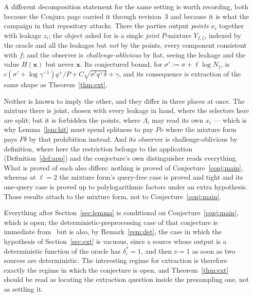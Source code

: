 \documentclass{conjura-conjecture}
\newcommand{\vx}{\mathbf{x}}
\begin{document}
\begin{remark}\label{rem:mixture}
A different decomposition statement for the same setting is worth
recording, both because the Conjura page carried it through revision~3 and
because it is what the campaign in that repository attacks. There the
parties output \emph{points} $x_i$ together with leakage $z_i$; the object
asked for is a single \emph{joint} $P$-mixture $Y_{f,\zeta}$, indexed by
the oracle and all the leakages but \emph{not} by the points, every
component consistent with $f$; and the observer is
\emph{challenge-oblivious} by fiat, seeing the leakage and the value
$H(\vx)$ but never $\vx$. Its conjectured bound, for
$\sigma' := \sigma + \ell\log N_1$, is
$c(\sigma'+\log\gamma^{-1})q^{+}/P + C\sqrt{\sigma'q^{+}\delta} + \gamma$,
and its consequence is extraction of the same shape as
Theorem~\ref{thm:ext}.

Neither is known to imply the other, and they differ in three places at
once. The mixture there is joint, chosen with every leakage in hand, where
the selectors here are split; but it is forbidden the points, where
$\Lambda_i$ may read its own $x_i$ --- which is why Lemma~\ref{lem:hit}
must spend splitness to pay $P\nu$ where the mixture form pays $P\delta$
by that prohibition instead. And its observer is challenge-oblivious by
definition, where here the restriction belongs to the application
(Definition~\ref{def:app}) and the conjecture's own distinguisher reads
everything. What is proved of each also differs: nothing is proved of
Conjecture~\ref{conj:main}, whereas at $\ell = 2$ the mixture form's
query-free case is proved and tight and its one-query case is proved up to
polylogarithmic factors under an extra hypothesis. Those results attach to
the mixture form, not to Conjecture~\ref{conj:main}.
\end{remark}

\begin{remark}\label{rem:notclaimed}
Everything after Section~\ref{sec:lemma} is conditional on
Conjecture~\ref{conj:main}, which is open; the deterministic-preprocessing
case of that conjecture is immediate from~\cite{CDGS} but is also, by
Remark~\ref{rem:det}, the case in which the hypothesis of
Section~\ref{sec:ext} is vacuous, since a source whose output is a
deterministic function of the oracle has $\delta^{\ast}_i = 1$, and then
$\nu = 1$ as soon as two sources are deterministic. The interesting regime
for extraction is therefore exactly the regime in which the conjecture is
open, and Theorem~\ref{thm:ext} should be read as locating the extraction
question inside the presampling one, not as settling it.
\end{remark}
\end{document}
